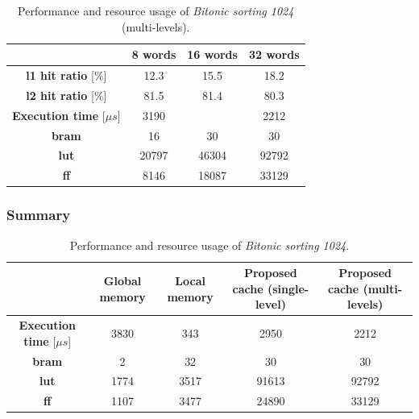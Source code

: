 \documentclass[11pt,a4paper,oneside]{memoir}
\begin{document}
\begin{table}[H]
	\begin{center}
		\begin{tabular}{cccc}
			\hline
			\rowcolor{gray!50}
			& \textbf{8 words} & \textbf{16 words} & \textbf{32 words} \\
			\hline
			\textbf{\ac{l1} hit ratio} [\%] & 12.3 & 15.5 & 18.2 \\
			\rowcolor{gray!25}
			\textbf{\ac{l2} hit ratio} [\%] & 81.5 & 81.4 & 80.3 \\
			\textbf{Execution time} [$\mu s$] & 3190 & & 2212 \\
			\rowcolor{gray!25}
			\textbf{\ac{bram}} & 16 & 30 & 30 \\
			\textbf{\acs{lut}} & 20797 & 46304 & 92792 \\
			\rowcolor{gray!25}
			\textbf{\acs{ff}} & 8146 & 18087 & 33129 \\
			\hline
		\end{tabular}
	\end{center}
	\caption{Performance and resource usage of \emph{Bitonic sorting 1024}
	(multi-levels).}
	\label{tab:bitonic_1024_l1_report}
\end{table}

\subsubsection{Summary}
\begin{table}[H]
	\begin{center}
		\begin{tabularx}{\textwidth}{CCCCC}
			\hline
			& \textbf{Global memory} & \textbf{Local memory} &
			\textbf{Proposed cache (single-level)} &
			\textbf{Proposed cache (multi-levels)} \\
			\hline
			\textbf{Execution time} [$\mu s$] & 3830 & 343 &
			2950 & 2212 \\
			\textbf{\ac{bram}} & 2 & 32 & 30 & 30 \\
			\textbf{\acs{lut}} & 1774 & 3517 & 91613 & 92792 \\
			\textbf{\acs{ff}} & 1107 & 3477 & 24890 & 33129 \\
			\hline
		\end{tabularx}
	\end{center}
	\caption{Performance and resource usage of \emph{Bitonic sorting 1024}.}
	\label{tab:bitonic_1024_report}
\end{table}
\fi
\end{document}
